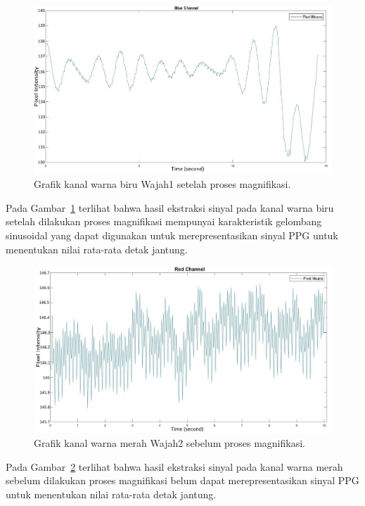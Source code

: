\begin{figure}[ht]
	\vspace{0.5em}
	\centering
	\includegraphics[width=\textwidth,height=0.25\textheight]{Blue_channel_wajah1-result}
	\caption{Grafik kanal warna biru Wajah1 setelah proses magnifikasi.}
	\label{fig:grafik-blue-wajah1-result}   
\end{figure}
Pada Gambar~\ref{fig:grafik-blue-wajah1-result} terlihat bahwa hasil ekstraksi sinyal pada kanal warna biru setelah dilakukan proses magnifikasi mempunyai karakteristik gelombang sinusoidal yang dapat digunakan untuk merepresentasikan sinyal PPG untuk menentukan nilai rata-rata detak jantung.
\newpage
\begin{figure}[ht]
	\vspace{0.5em}
	\centering
	\includegraphics[width=\textwidth,height=0.25\textheight]{Red_channel_wajah2-ori}
	\caption{Grafik kanal warna merah Wajah2 sebelum proses magnifikasi.}
	\label{fig:grafik-red-wajah2}   
\end{figure}
Pada Gambar~\ref{fig:grafik-red-wajah2} terlihat bahwa hasil ekstraksi sinyal pada kanal warna merah sebelum dilakukan proses magnifikasi belum dapat merepresentasikan sinyal PPG untuk menentukan nilai rata-rata detak jantung.

